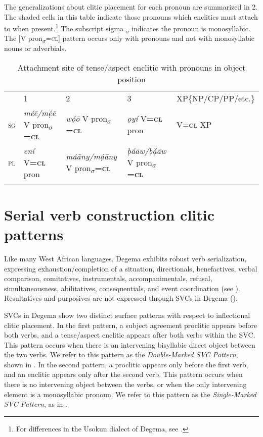 \documentclass[output=paper]{langsci/langscibook}
\begin{document}
The generalizations about clitic placement for each pronoun are summarized in 2. The shaded cells in this table indicate those pronouns which enclitics must attach to when present.\footnote{For differences in the Usokun dialect of Degema, see \citet{Offah2000}.} 
The subscript sigma \textsubscript{$\sigma $} indicates the pronoun is monosyllabic. The [V pron\textsubscript{$\sigma $}=\textsc{cl}] pattern occurs only with pronouns and not with monosyllabic nouns or adverbials.

\begin{table}
\caption{Attachment site of tense/aspect enclitic with pronouns in object position}
\label{bkm:Ref448075175}

\begin{tabularx}{\textwidth}{XXXXX}
& {1} & {2} & {3} & {XP\{NP/CP/PP/etc.\}}\\
\lsptoprule
{\scshape sg} & {\itshape méē/mẹ́ē} {V pron\textsubscript{$\sigma $}\textbf{\textsc{=cl}}} & {\itshape wọ́ō} {V pron\textsubscript{$\sigma $}\textbf{=}\textbf{\textsc{cl}}} & {\itshape ọyí} {V\textbf{=}\textbf{\textsc{cl}} pron} & {V=\textbf{\textsc{cl}} XP}\\
{\scshape pl} & {\itshape ení} {V\textbf{=}\textbf{\textsc{cl}} pron} & {\itshape máāny/mạ́āny} {V pron\textsubscript{$\sigma $}\textbf{=}\textbf{\textsc{cl}}} & {\itshape ḅáāw/ḅạ́āw} {V pron\textsubscript{$\sigma $}\textbf{=}\textbf{\textsc{cl}}} & \\
\lspbottomrule
\end{tabularx}
\end{table}

\section{Serial verb construction clitic patterns}

Like many West African languages, Degema exhibits robust verb serialization, expressing exhaustion/completion of a situation, directionals, benefactives, verbal comparison, comitatives, instrumentals, accompanimentals, refusal, simultaneousness, abilitatives, consequentials, and event coordination (see \citealt{Kari2003a}). Resultatives and purposives are not expressed through SVCs in Degema (\citealt[59--60, 206]{Kari2004}).

SVCs in Degema show two distinct surface patterns with respect to inflectional clitic placement. In the first pattern, a subject agreement proclitic appears before both verbs, and a tense/aspect enclitic appears after both verbs within the SVC. This pattern occurs when there is an intervening bisyllabic direct object between the two verbs. We refer to this pattern as the \textit{Double-Marked SVC Pattern}, shown in . In the second pattern, a proclitic appears only before the first verb, and an enclitic appears only after the second verb. This pattern occurs when there is no intervening object between the verbs, or when the only intervening element is a monosyllabic pronoun. We refer to this pattern as the \textit{Single-Marked SVC Pattern}, as in .
\end{document}
